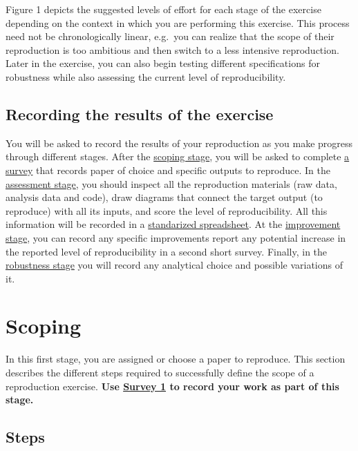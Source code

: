 \documentclass[]{book}
\begin{document}
Figure 1 depicts the suggested levels of effort for each stage of the exercise depending on the context in which you are performing this exercise. This process need not be chronologically linear, e.g.~you can realize that the scope of their reproduction is too ambitious and then switch to a less intensive reproduction. Later in the exercise, you can also begin testing different specifications for robustness while also assessing the current level of reproducibility.

\hypertarget{recording-the-results-of-the-exercise}{%
\section{Recording the results of the exercise}\label{recording-the-results-of-the-exercise}}

You will be asked to record the results of your reproduction as you make progress through different stages. After the \protect\hyperlink{scoping}{scoping stage}, you will be asked to complete \href{https://berkeley.qualtrics.com/jfe/form/SV_8hLHNI6LGSYchEN}{a survey} that records paper of choice and specific outputs to reproduce. In the \protect\hyperlink{assessment}{assessment stage}, you should inspect all the reproduction materials (raw data, analysis data and code), draw diagrams that connect the target output (to reproduce) with all its inputs, and score the level of reproducibility. All this information will be recorded in a \href{ADD\%20LINK}{standarized spreadsheet}. At the \href{(\#improvements)}{improvement stage}, you can record any specific improvements report any potential increase in the reported level of reproducibility in a second short survey. Finally, in the \protect\hyperlink{robust}{robustness stage} you will record any analytical choice and possible variations of it.

\hypertarget{scoping}{%
\chapter{Scoping}\label{scoping}}

In this first stage, you are assigned or choose a paper to reproduce. This section describes the different steps required to successfully define the scope of a reproduction exercise. \textbf{Use \href{https://berkeley.qualtrics.com/jfe/form/SV_3UWe5xu3qjeh0c5}{Survey 1} to record your work as part of this stage.}

\hypertarget{steps}{%
\section{Steps}\label{steps}}
\end{document}
